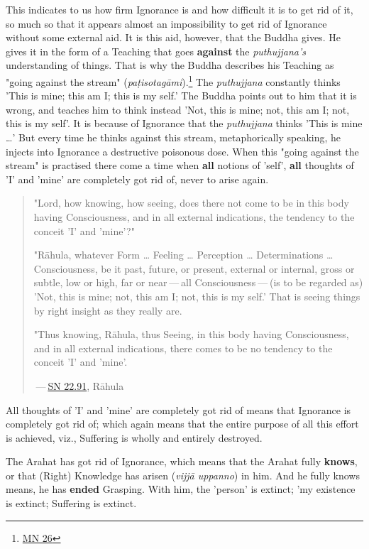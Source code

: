 This indicates to us how firm Ignorance is and how difficult it is to
get rid of it, so much so that it appears almost an impossibility to get
rid of Ignorance without some external aid. It is this aid, however, that
the Buddha gives. He gives it in the form of a Teaching that goes
\textbf{against} the \emph{puthujjana’s} understanding of things. That is why the
Buddha describes his Teaching as "going against the stream"
(\emph{paṭisotagāmi}).\footnote{\href{https://suttacentral.net/mn26/en/bodhi}{MN 26}} The \emph{puthujjana}
constantly thinks 'This is mine; this am I; this is my self.' The Buddha
points out to him that it is wrong, and teaches him to think instead
'Not, this is mine; not, this am I; not, this is my self'. It is because
of Ignorance that the \emph{puthujjana} thinks 'This is mine …​' But every
time he thinks against this stream, metaphorically speaking, he injects
into Ignorance a destructive poisonous dose. When this "going against
the stream" is practised there come a time when \textbf{all} notions of 'self',
\textbf{all} thoughts of 'I' and 'mine' are completely got rid of, never to
arise again.


\begin{quotation}
"Lord, how knowing, how seeing, does there not come to be in this body
having Consciousness, and in all external indications, the tendency to
the conceit 'I' and 'mine'?"


"Rāhula, whatever Form …​ Feeling …​ Perception …​ Determinations …​
Consciousness, be it past, future, or present, external or internal,
gross or subtle, low or high, far or near — all Consciousness — (is to
be regarded as) 'Not, this is mine; not, this am I; not, this is my
self.' That is seeing things by right insight as they really are.


"Thus knowing, Rāhula, thus Seeing, in this body having Consciousness,
and in all external indications, there comes to be no tendency to the
conceit 'I' and 'mine'.


 — \href{https://suttacentral.net/sn22.91/en/bodhi}{SN 22.91}, Rāhula


\end{quotation}

All thoughts of 'I' and 'mine' are completely got rid of means that
Ignorance is completely got rid of; which again means that the entire
purpose of all this effort is achieved, viz., Suffering is wholly and
entirely destroyed.


The Arahat has got rid of Ignorance, which means that the Arahat fully
\textbf{knows}, or that (Right) Knowledge has arisen (\emph{vijjā uppanno}) in
him. And he fully knows means, he has \textbf{ended} Grasping. With him, the
'person' is extinct; 'my existence is extinct; Suffering is extinct.


